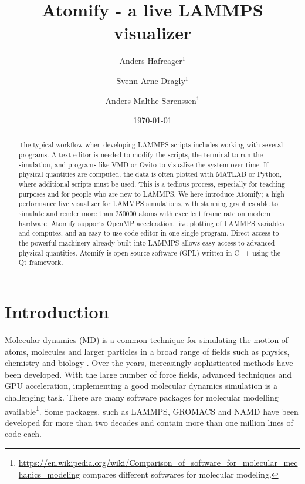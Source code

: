\documentclass[aps,pre,twocolumn,letterpaper,floatfix,nofootinbib]{revtex4}
\begin{document}
\title{Atomify - a live LAMMPS visualizer}
\author{Anders Hafreager$^1$}
\author{Svenn-Arne Dragly$^{1}$} 
\author{Anders Malthe-S\o renssen$^1$}
\date{\today} 


\begin{abstract}
%
The typical workflow when developing LAMMPS scripts includes working with
several programs.
A text editor is needed to modify the scripts,
the terminal to run the simulation, and programs like VMD or Ovito to visualize
the system over time.
If physical quantities are computed, the data is often plotted with MATLAB or
Python, where additional scripts must be used.
This is a tedious process, especially for teaching purposes and for people who
are new to LAMMPS.
We here introduce Atomify;
a high performance live visualizer for LAMMPS simulations,
with stunning graphics able to simulate and render more than 250000 atoms with
excellent frame rate on modern hardware.
Atomify supports OpenMP acceleration, live plotting of LAMMPS variables and
computes, and an easy-to-use code editor in one single program.
Direct access to the powerful machinery already built into LAMMPS allows easy
access to advanced physical quantities.
Atomify is open-source software (GPL) written in C++ using the Qt framework.
%
\end{abstract} 
 
\maketitle

\section{Introduction}
%
Molecular dynamics (MD) is a common technique for simulating the motion of atoms, molecules and larger particles in a broad range of fields such as physics, chemistry and biology \cite{flerefelt}.
Over the years, increasingly sophisticated methods have been developed.
With the large number of force fields, advanced techniques and GPU acceleration,
implementing a good molecular dynamics simulation is a challenging task.
There are many software packages for molecular modelling
available\footnote{\url{https://en.wikipedia.org/wiki/Comparison_of_software_for_molecular_mechanics_modeling} compares different softwares for molecular modeling.}.
Some packages, such as LAMMPS\cite{Plimpton1995Fast}, GROMACS\cite{Pronk2013}
and NAMD\cite{Phillips2005Scalable} have been developed for more than two decades 
and contain more than one million lines of code each.
\end{document}
